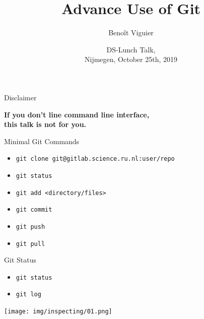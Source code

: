 \documentclass[usenames,dvipsnames,9pt]{beamer}
\title{Advance Use of Git}
\author[Viguier]
{Beno\^{i}t Viguier}
\date[Short Occasion]{\vspace{0.5cm}DS-Lunch Talk,\\Nijmegen, October 25th, 2019}
\begin{document}
%
\begin{frame}
  \titlepage
\end{frame}


\begin{frame}{Disclaimer}
  \begin{center}
    \alert{\Large{\textbf{If you don't line command line interface,\\this talk is not for you.}}}
  \end{center}
\end{frame}

%
\begin{frame}{Minimal Git Commands}
  \begin{itemize}
    \item \lstinline|git clone git@gitlab.science.ru.nl:user/repo|
    \item \lstinline|git status|
    \item \lstinline|git add <directory/files>|
    \item \lstinline|git commit|
    \item \lstinline|git push|
    \item \lstinline|git pull|
  \end{itemize}
\end{frame}

%
\begin{frame}{Git Status}
  \begin{itemize}
    \item \lstinline|git status|
    \item \lstinline|git log|
  \end{itemize}

  \texttt{[image: img/inspecting/01.png]}
\end{frame}
\end{document}

